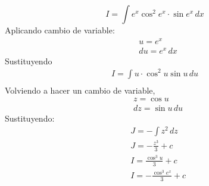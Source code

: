 \begin{problem}[a]
    \begin{equation}
        I = \int e^x\cos^2{e^x} \cdot \sin{e^x}\,dx 
    \end{equation}
    Aplicando cambio de variable:
    \begin{align*}
        &u = e^x\\ 
        &du = e^x\, dx
    \end{align*}
    Sustituyendo
    \begin{align*}
    I = \int u \cdot \cos^2{u} \sin{u}  \,du\\
    \end{align*}
    Volviendo a hacer un cambio de variable,
\begin{align*}
    &z = \cos{u}\\
    &dz = \sin{u}\, du
\end{align*}
Sustituyendo:
\begin{align*}
    &J = - \int z^2\, dz\\
    &J = - \frac{z^3}{3} + c\\
    &I = \frac{\cos^3{u}}{3} + c \\
    &I = - \frac{\cos^3{e^x}}{3} + c
\end{align*}
\end{problem}






























